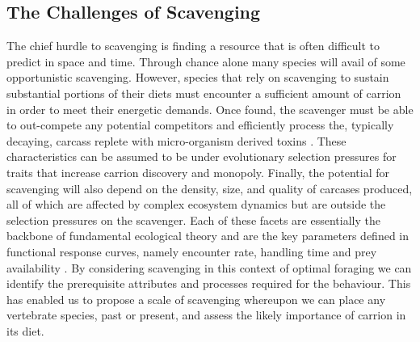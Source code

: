 \documentclass[a4paper,12pt]{article}
\begin{document}
\subsection*{The Challenges of Scavenging} 
The chief hurdle to scavenging is finding a resource that is often difficult to predict in space and time.
Through chance alone many species will avail of some opportunistic scavenging. 
However, species that rely on scavenging to sustain substantial portions of their diets must encounter a sufficient amount of carrion in order to meet their energetic demands.
Once found, the scavenger must be able to out-compete any potential competitors and efficiently process the, typically decaying, carcass replete with micro-organism derived toxins  \citep{ruxton2014fruit}. 
These characteristics can be assumed to be under evolutionary selection pressures for traits that increase carrion discovery and monopoly.
Finally, the potential for scavenging will also depend on the density, size, and quality of carcases produced, all of which are affected by complex ecosystem dynamics but are outside the selection pressures on the scavenger.
Each of these facets are essentially the backbone of fundamental ecological theory and are the key parameters defined in functional response curves, namely encounter rate, handling time and prey availability \citep{jeschke2002predator}.  
By considering scavenging in this context of optimal foraging we can identify the prerequisite attributes and processes required for the behaviour. 
This has enabled us to propose a scale of scavenging whereupon we can place any vertebrate species, past or present, and assess the likely importance of carrion in its diet. 
\end{document}
